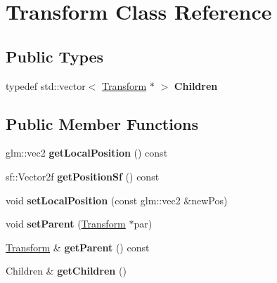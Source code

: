\hypertarget{class_transform}{\section{Transform Class Reference}
\label{class_transform}
}
\subsection*{Public Types}
\begin{DoxyCompactItemize}
\item 
\hypertarget{class_transform_a58b9808d3d9a4f1a04f2ed7ee5cff0f0}{typedef std\-::vector$<$ \hyperlink{class_transform}{Transform} $\ast$ $>$ {\bfseries Children}}\label{class_transform_a58b9808d3d9a4f1a04f2ed7ee5cff0f0}

\end{DoxyCompactItemize}
\subsection*{Public Member Functions}
\begin{DoxyCompactItemize}
\item 
\hypertarget{class_transform_ab331def81fa1a08e1f14b0ae977a98cb}{glm\-::vec2 {\bfseries get\-Local\-Position} () const }\label{class_transform_ab331def81fa1a08e1f14b0ae977a98cb}

\item 
\hypertarget{class_transform_a2d4f4b7192cca6765638ef29a0519935}{sf\-::\-Vector2f {\bfseries get\-Position\-Sf} () const }\label{class_transform_a2d4f4b7192cca6765638ef29a0519935}

\item 
\hypertarget{class_transform_a5da75c53ee14bcc1042a192df5f3f0b7}{void {\bfseries set\-Local\-Position} (const glm\-::vec2 \&new\-Pos)}\label{class_transform_a5da75c53ee14bcc1042a192df5f3f0b7}

\item 
\hypertarget{class_transform_a0bbb28cce7bca9363703b41ca10dcc57}{void {\bfseries set\-Parent} (\hyperlink{class_transform}{Transform} $\ast$par)}\label{class_transform_a0bbb28cce7bca9363703b41ca10dcc57}

\item 
\hypertarget{class_transform_a32f297083089e707628cd01dac598e40}{\hyperlink{class_transform}{Transform} \& {\bfseries get\-Parent} () const }\label{class_transform_a32f297083089e707628cd01dac598e40}

\item 
\hypertarget{class_transform_a6d76a64ce6feb3c8f3eb45352b77f74c}{Children \& {\bfseries get\-Children} ()}\label{class_transform_a6d76a64ce6feb3c8f3eb45352b77f74c}

\end{DoxyCompactItemize}
